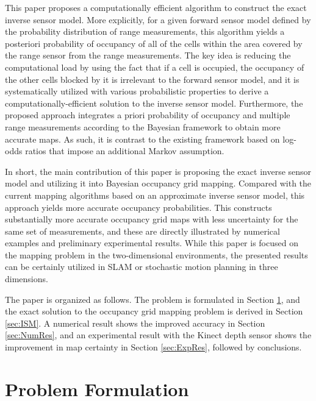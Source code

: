 \documentclass[letterpaper, 10pt, conference]{ieeeconf}
\begin{document}
This paper proposes a computationally efficient algorithm to construct the exact inverse sensor model. More explicitly, for a given forward sensor model defined by the probability distribution of range measurements, this algorithm yields a posteriori probability of occupancy of all of the cells within the area covered by the range sensor from the range measurements. The key idea is reducing the computational load by using the fact that if a cell is occupied, the occupancy of the other cells blocked by it is irrelevant to the forward sensor model, and it is systematically utilized with various probabilistic properties to derive a computationally-efficient solution to the inverse sensor model. Furthermore, the proposed approach integrates a priori probability of occupancy and multiple range measurements according to the Bayesian framework to obtain more accurate maps. As such, it is contrast to the existing framework based on log-odds ratios that impose an additional Markov assumption. 


In short, the main contribution of this paper is proposing the exact inverse sensor model and utilizing it into Bayesian occupancy grid mapping. Compared with the current mapping algorithms based on an approximate inverse sensor model, this approach yields more accurate occupancy probabilities. This constructs substantially more accurate occupancy grid maps with less uncertainty for the same set of measurements, and these are directly illustrated by numerical examples and preliminary experimental results. While this paper is focused on the mapping problem in the two-dimensional environments, the presented results can be certainly utilized in SLAM or stochastic motion planning in three dimensions.



The paper is organized as follows.
The problem is formulated in Section \ref{sec:ProbForm}, and the exact solution to the occupancy grid mapping problem is derived in Section \ref{sec:ISM}.
A numerical result shows the improved accuracy in Section \ref{sec:NumRes}, and an experimental result with the Kinect depth sensor shows the improvement in map certainty in Section \ref{sec:ExpRes}, followed by conclusions.


\section{Problem Formulation}
\label{sec:ProbForm}
\end{document}
